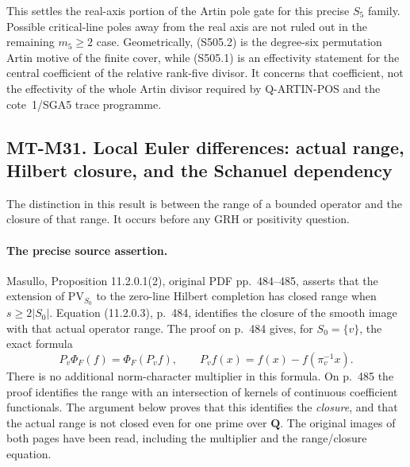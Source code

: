 This settles the real-axis portion of the
Artin pole gate for this precise $S_5$
family. Possible critical-line poles away
from the real axis are not ruled out in
the remaining $m_5\ge2$ case. Geometrically,
(S505.2) is the degree-six permutation
Artin motive of the finite cover, while
(S505.1) is an effectivity statement for
the central coefficient of the relative
rank-five divisor. It concerns that
coefficient, not the effectivity of the
whole Artin divisor required by
Q-ARTIN-POS and the cote~1/SGA5 trace programme.

\subsection*{MT-M31. Local Euler differences: actual range, Hilbert closure,
and the Schanuel dependency}

The distinction in this result is between the range of a bounded
operator and the closure of that range.  It occurs before any
GRH or positivity question.

\paragraph{The precise source assertion.}
Masullo, Proposition 11.2.0.1(2), original PDF pp.~484--485,
asserts that the extension of $\mathrm{PV}_{S_0}$ to the
zero-line Hilbert completion has closed range when
$s\geq 2|S_0|$.  Equation (11.2.0.3), p.~484, identifies
the closure of the smooth image with that actual operator range.
The proof on p.~484 gives, for $S_0=\{v\}$, the exact formula
\[
  P_v\Phi_F(f)=\Phi_F(P_vf),\qquad
  P_vf(x)=f(x)-f(\pi_v^{-1}x).
  \tag{M31.1}
\]
There is no additional norm-character multiplier in this formula.
On p.~485 the proof identifies the range with an intersection
of kernels of continuous coefficient functionals.  The argument
below proves that this identifies the \emph{closure}, and that
the actual range is not closed even for one prime over $\mathbf Q$.
The original images of both pages have been read, including
the multiplier and the range/closure equation.

